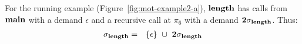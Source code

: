 \documentclass[9pt,nonatbib]{sigplanconf}
\newcommand{\added}[1]{#1}
\begin{document}


\added{For   the   running  example   (Figure~\ref{fig:mot-example2-a}),
$\mathbf{length}$  has calls  from  $\mathbf{main}$  with a  demand  $\epsilon$ and  a
recursive      call      at       $\pi_6$      with      a      demand
${\mathbf{2}}\sigma_{\mathit{\mathbf{length}}}$.} Thus:
\begin{eqnarray*}
\sigma_{\mathbf{length}}                    &=&                   \{\epsilon\}
~\cup~{{\mathbf{2}}\sigma_{\mathit{\mathbf{length}}}}
\end{eqnarray*}

\end{document}
